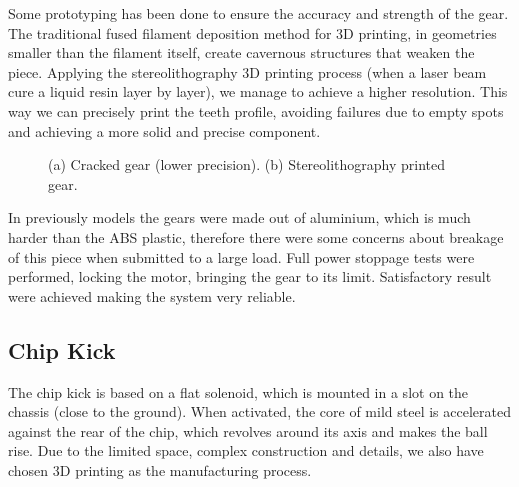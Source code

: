 Some prototyping has been done to ensure the accuracy and strength of the gear. The traditional fused filament deposition method for 3D printing, in geometries smaller than the filament itself, create cavernous structures that weaken the piece. Applying the stereolithography 3D printing process (when a laser beam cure a liquid resin layer by layer), we manage to achieve a higher resolution. This way we can precisely print the teeth profile, avoiding failures due to empty spots and achieving a more solid and precise component.

\begin{figure}[!htb]
	\centering
	\caption{(a) Cracked gear (lower precision). (b) Stereolithography printed gear.}
	\label{mec3}
\end{figure}

In previously models the gears were made out of aluminium, which is much harder than the ABS plastic, therefore there were some concerns about breakage of this piece when submitted to a large load.
Full power stoppage tests were performed, locking the motor, bringing the gear to its limit. Satisfactory result were achieved making the system very reliable.

\subsection{Chip Kick}

The chip kick is based on a flat solenoid, which is mounted in a slot on the chassis (close to the ground). When activated, the core of mild steel is accelerated against the rear of the chip, which revolves around its axis and makes the ball rise. Due to the limited space, complex construction and details, we also have chosen 3D printing as the manufacturing process.

